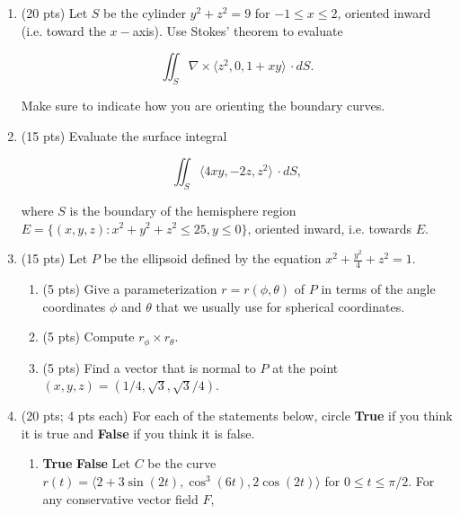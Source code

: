\documentclass[12 pt]{report}
\begin{document}
\newpage
\begin{enumerate}

\item (20 pts) Let $S$ be the cylinder $y^2+z^2 = 9$ for $-1 \leq x \leq 2$, oriented inward (i.e. toward the $x-$axis). Use Stokes' theorem to evaluate

\[
\iint_S \nabla \times \langle z^2, 0, 1+xy \rangle \, \cdot dS.
\]

Make sure to indicate how you are orienting the boundary curves. 

\vfill

\newpage \item (15 pts) Evaluate the surface integral

\[
\iint_S \langle 4xy, -2z, z^2 \rangle \, \cdot dS,
\]

where $S$ is the boundary of the hemisphere region $E = \{(x,y,z): x^2 + y^2 + z^2 \leq 25, y \leq 0 \}$, oriented inward, i.e. towards $E$. 

\vfill

\newpage \item (15 pts) Let $P$ be the ellipsoid defined by the equation $x^2 + \frac{y^2}{4} + z^2 = 1$. 

\begin{enumerate} \item (5 pts) Give a parameterization $r = r(\phi, \theta)$ of $P$ in terms of the angle coordinates $\phi$ and $\theta$ that we usually use for spherical coordinates.

\vspace{4cm}

\item (5 pts) Compute $r_\phi \times r_\theta$. 

\vfill

\item (5 pts) Find a vector that is normal to $P$ at the point $(x,y,z) = (1/4, \sqrt{3}, \sqrt{3}/4)$. 

\vfill

\end{enumerate}

\newpage \item (20 pts; 4 pts each) For each of the statements below, circle \textbf{True} if you think it is true and \textbf{False} if you think it is false. 

\begin{enumerate} \item \textbf{True}\hspace{5pt} \textbf{False} \hspace{5pt} Let $C$ be the curve $r(t) = \langle 2 + 3 \sin(2t), \cos^3(6t), 2 \cos(2 t) \rangle$ for $0 \leq t \leq \pi/2$. For any conservative vector field $F$,  


\end{enumerate}
\end{enumerate}
\end{document}
